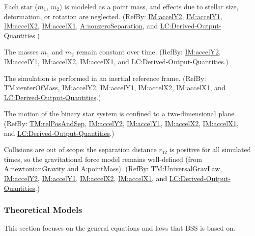 \documentclass[12pt]{article}
\begin{document}
\begin{description}[font=\normalfont]
\item[pointMass:\phantomsection\label{pointMass}]{Each star (${m_{1}}$, ${m_{2}}$) is modeled as a point mass, and effects due to stellar size, deformation, or rotation are neglected. (RefBy: \hyperref[IM:accelY2]{IM:accelY2}, \hyperref[IM:accelY1]{IM:accelY1}, \hyperref[IM:accelX2]{IM:accelX2}, \hyperref[IM:accelX1]{IM:accelX1}, \hyperref[nonzeroSeparation]{A:nonzeroSeparation}, and \hyperref[lcDerivedOutputs]{LC:Derived-Output-Quantities}.)}
\item[constantMass:\phantomsection\label{constantMass}]{The masses ${m_{1}}$ and ${m_{2}}$ remain constant over time. (RefBy: \hyperref[IM:accelY2]{IM:accelY2}, \hyperref[IM:accelY1]{IM:accelY1}, \hyperref[IM:accelX2]{IM:accelX2}, \hyperref[IM:accelX1]{IM:accelX1}, and \hyperref[lcDerivedOutputs]{LC:Derived-Output-Quantities}.)}
\item[inertialFrame:\phantomsection\label{inertialFrame}]{The simulation is performed in an inertial reference frame. (RefBy: \hyperref[TM:centerOfMass]{TM:centerOfMass}, \hyperref[IM:accelY2]{IM:accelY2}, \hyperref[IM:accelY1]{IM:accelY1}, \hyperref[IM:accelX2]{IM:accelX2}, \hyperref[IM:accelX1]{IM:accelX1}, and \hyperref[lcDerivedOutputs]{LC:Derived-Output-Quantities}.)}
\item[planar:\phantomsection\label{planar}]{The motion of the binary star system is confined to a two-dimensional plane. (RefBy: \hyperref[TM:relPosAndSep]{TM:relPosAndSep}, \hyperref[IM:accelY2]{IM:accelY2}, \hyperref[IM:accelY1]{IM:accelY1}, \hyperref[IM:accelX2]{IM:accelX2}, \hyperref[IM:accelX1]{IM:accelX1}, and \hyperref[lcDerivedOutputs]{LC:Derived-Output-Quantities}.)}
\item[nonzeroSeparation:\phantomsection\label{nonzeroSeparation}]{Collisions are out of scope: the separation distance ${r_{12}}$ is positive for all simulated times, so the gravitational force model remains well-defined (from \hyperref[newtonianGravity]{A:newtonianGravity} and \hyperref[pointMass]{A:pointMass}). (RefBy: \hyperref[TM:UniversalGravLaw]{TM:UniversalGravLaw}, \hyperref[IM:accelY2]{IM:accelY2}, \hyperref[IM:accelY1]{IM:accelY1}, \hyperref[IM:accelX2]{IM:accelX2}, \hyperref[IM:accelX1]{IM:accelX1}, and \hyperref[lcDerivedOutputs]{LC:Derived-Output-Quantities}.)}
\end{description}
\subsubsection{Theoretical Models}
\label{Sec:TMs}
This section focuses on the general equations and laws that BSS is based on.
\end{document}
